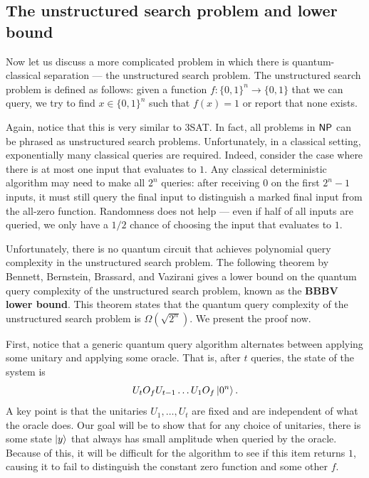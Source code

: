 \documentclass[a4paper,draft]{article}
\begin{document}
\subsection{The unstructured search problem and lower bound}

Now let us discuss a more complicated problem in which there is
quantum-classical separation — the unstructured search problem. The
unstructured search problem is defined as follows: given a function $f :
\{0, 1\}^{n} \to \{0, 1\}$ that we can query, we try to find $x \in \{0,
1\}^n$ such that $f(x) = 1$ or report that none exists.

Again, notice that this is very similar to 3SAT. In fact, all problems in
$\operatorname{\mathsf{NP}}$ can be phrased as unstructured search problems. Unfortunately, in a
classical setting, exponentially many classical queries are required.
Indeed, consider the case where there is at most one input that evaluates
to $1$. Any classical deterministic algorithm may need to make all $2^n$
queries: after receiving $0$ on the first $2^n - 1$ inputs, it must still
query the final input to distinguish a marked final input from the
all-zero function. Randomness does not help — even if half of all inputs
are queried, we only have a $1/2$ chance of choosing the input that
evaluates to $1$.

Unfortunately, there is no quantum circuit that achieves polynomial query
complexity in the unstructured search problem. The following theorem by
Bennett, Bernstein, Brassard, and Vazirani gives a lower bound on the
quantum query complexity of the unstructured search problem, known as the
\textbf{BBBV lower bound}. This theorem states that the quantum query
complexity of the unstructured search problem is $\Omega (\sqrt{2^n})$. We
present the proof now.

First, notice that a generic quantum query algorithm alternates between
applying some unitary and applying some oracle. That is, after $t$
queries, the state of the system is
\[
  U_t O_f U_{t - 1} \dots U_1 O_f \left\lvert 0^n\right\rangle.
\]
A key point is that the unitaries $U_1, \dots, U_t$ are fixed and are
  independent of what the oracle does. Our goal will be to show that for
  any choice of unitaries, there is some state $\left\lvert y\right\rangle$ that always has
  small amplitude when queried by the oracle. Because of this, it will be
  difficult for the algorithm to see if this item returns $1$, causing it
  to fail to distinguish the constant zero function and some other $f$.
\end{document}
